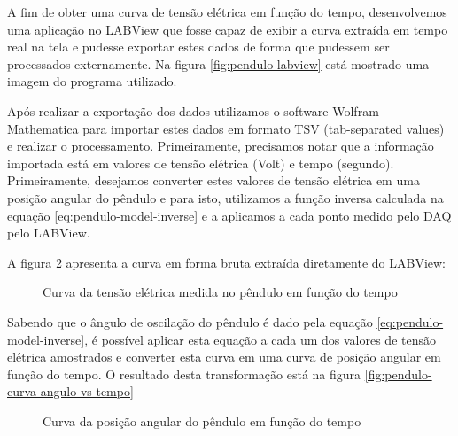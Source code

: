 \documentclass[12pt,a4paper]{instrumentacao}
\begin{document}
A fim de obter uma curva de tensão elétrica em função do tempo, desenvolvemos uma aplicação no LABView que fosse capaz de exibir a curva extraída em tempo real na tela e pudesse exportar estes dados de forma que pudessem ser processados externamente. Na figura \ref{fig:pendulo-labview} está mostrado uma imagem do programa utilizado.


Após realizar a exportação dos dados utilizamos o software Wolfram Mathematica para importar estes dados em formato TSV (tab-separated values) e realizar o processamento. Primeiramente, precisamos notar que a informação importada está em valores de tensão elétrica (Volt) e tempo (segundo). Primeiramente, desejamos converter estes valores de tensão elétrica em uma posição angular do pêndulo e para isto, utilizamos a função inversa calculada na equação \ref{eq:pendulo-model-inverse} e a aplicamos a cada ponto medido pelo DAQ pelo LABView. 

A figura \ref{fig:pendulo-curva-tensao-vs-tempo} apresenta a curva em forma bruta extraída diretamente do LABView:

\begin{figure}[H]
\caption{Curva da tensão elétrica medida no pêndulo em função do tempo}
\label{fig:pendulo-curva-tensao-vs-tempo}
\end{figure}

Sabendo que o ângulo de oscilação do pêndulo é dado pela equação \ref{eq:pendulo-model-inverse}, é possível aplicar esta equação a cada um dos valores de tensão elétrica amostrados e converter esta curva em uma curva de posição angular em função do tempo. O resultado desta transformação está na figura \ref{fig:pendulo-curva-angulo-vs-tempo}

\begin{figure}[H]
\caption{Curva da posição angular do pêndulo em função do tempo}
\label{fig:pendulo-curva-tensao-vs-tempo}
\end{figure}


\end{document}
